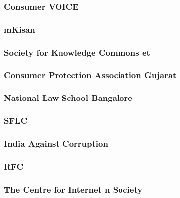 \documentclass{article}
\begin{document}
\subsubsection{Consumer VOICE}


\subsubsection{mKisan}


\subsubsection{Society for Knowledge Commons et}


\subsubsection{Consumer Protection Association Gujarat}


\subsubsection{National Law School Bangalore}


\subsubsection{SFLC}


\subsubsection{India Against Corruption}


\subsubsection{RFC}


\subsubsection{The Centre for Internet n Society}

\end{document}

